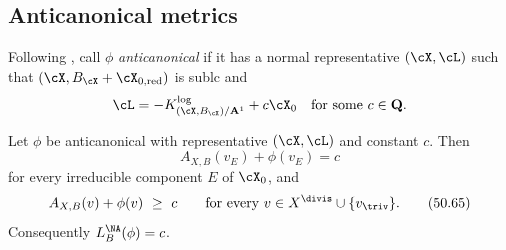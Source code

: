 \subsection{Anticanonical metrics}
\label{sec:ch50-anticanonical}

Following \cite[Definition~7.31]{BHJ17}, call $\phi$
\emph{anticanonical} if it has a normal representative
$(\cX,\cL)$ such that $(\cX,B_{\cX}+\cX_{0,\mathrm{red}})$ is sublc and
\[
        \cL=-K^{\log}_{(\cX,B_{\cX})/\mathbf A^1}+c\cX_0
        \quad\text{for some }c\in\mathbf Q.
\]

\begin{lemma}
\label{lem:ch50-anticanonical-constant}
Let $\phi$ be anticanonical with representative $(\cX,\cL)$ and
constant $c$.  Then
\[
 A_{X,B}(v_E)+\phi(v_E)=c
\tag{50.64}\label{eq:ch50-anticanonical-components}
\]
for every irreducible component $E$ of $\cX_0$, and
\[
 A_{X,B}(v)+\phi(v)\ \ge\ c
 \qquad\text{for every }v\in X^{\divis}\cup\{v_{\triv}\}.
\tag{50.65}\label{eq:ch50-anticanonical-inequality}
\]
Consequently $L^{\NA}_B(\phi)=c$.
\end{lemma}

